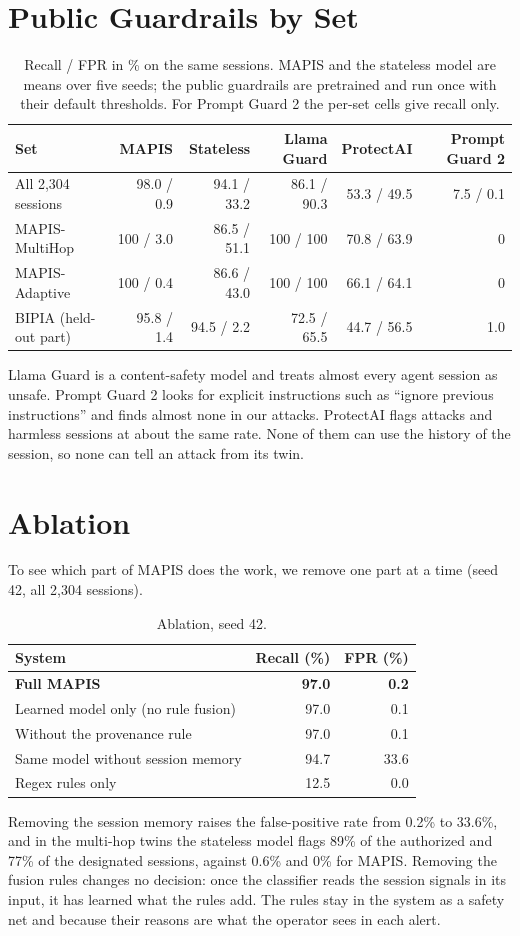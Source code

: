 \section{Public Guardrails by Set}
\begin{table}[H]
\centering\small
\begin{tabular}{lrrrrr}
\toprule
Set & MAPIS & Stateless & Llama Guard & ProtectAI & Prompt Guard 2\\
\midrule
All 2,304 sessions & 98.0 / 0.9 & 94.1 / 33.2 & 86.1 / 90.3 & 53.3 / 49.5 & 7.5 / 0.1\\
MAPIS-MultiHop & 100 / 3.0 & 86.5 / 51.1 & 100 / 100 & 70.8 / 63.9 & 0\\
MAPIS-Adaptive & 100 / 0.4 & 86.6 / 43.0 & 100 / 100 & 66.1 / 64.1 & 0\\
BIPIA (held-out part) & 95.8 / 1.4 & 94.5 / 2.2 & 72.5 / 65.5 & 44.7 / 56.5 & 1.0\\
\bottomrule
\end{tabular}
\caption{Recall / FPR in \% on the same sessions. MAPIS and the stateless model are means over five seeds; the public guardrails are pretrained and run once with their default thresholds. For Prompt Guard 2 the per-set cells give recall only.}
\end{table}
Llama Guard is a content-safety model and treats almost every agent session as unsafe. Prompt Guard 2 looks for explicit instructions such as ``ignore previous instructions'' and finds almost none in our attacks. ProtectAI flags attacks and harmless sessions at about the same rate. None of them can use the history of the session, so none can tell an attack from its twin.

\section{Ablation}
To see which part of MAPIS does the work, we remove one part at a time (seed 42, all 2,304 sessions).
\begin{table}[H]
\centering\small
\begin{tabular}{lrr}
\toprule
System & Recall (\%) & FPR (\%)\\
\midrule
\textbf{Full MAPIS} & \textbf{97.0} & \textbf{0.2}\\
Learned model only (no rule fusion) & 97.0 & 0.1\\
Without the provenance rule & 97.0 & 0.1\\
Same model without session memory & 94.7 & 33.6\\
Regex rules only & 12.5 & 0.0\\
\bottomrule
\end{tabular}
\caption{Ablation, seed 42.}
\end{table}
Removing the session memory raises the false-positive rate from 0.2\% to 33.6\%, and in the multi-hop twins the stateless model flags 89\% of the authorized and 77\% of the designated sessions, against 0.6\% and 0\% for MAPIS. Removing the fusion rules changes no decision: once the classifier reads the session signals in its input, it has learned what the rules add. The rules stay in the system as a safety net and because their reasons are what the operator sees in each alert.

